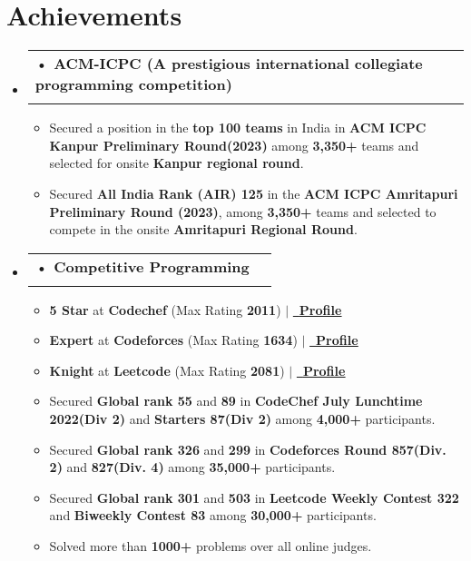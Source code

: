 \documentclass[letterpaper,11pt]{article}
\makeatletter
\newcommand{\resumeItem}[1]{
  \item\small{
	{#1 \vspace{-2pt}}
  }
}
\newcommand{\resumeSubheading}[4]{
  \vspace{-2pt}\item
	\begin{tabular*}{1.0\textwidth}[t]{l@{\extracolsep{\fill}}r}
  	\textbf{#1} & \textbf{\small #2} \\
  	\textit{\small#3} & \textit{\small #4} \\
	\end{tabular*}\vspace{-7pt}
}
\newcommand{\resumeSubHeadingListStart}{\begin{itemize}[leftmargin=0.0in, label={}]}
\newcommand{\resumeSubHeadingListEnd}{\end{itemize}}
\newcommand{\resumeItemListStart}{\begin{itemize}}
\newcommand{\resumeItemListEnd}{\end{itemize}\vspace{-5pt}}
\makeatother
\begin{document}
\section{Achievements }
 \begin{itemize}[leftmargin=0.12in, label={}]
 
  \vspace{-7pt}
   \resumeSubHeadingListStart
   
	\resumeSubheading {\hspace{-5pt}• ACM-ICPC (A prestigious international collegiate programming competition)}{}{}{}
  	\resumeItemListStart
          \vspace{-10pt}
    	 \resumeItem{Secured a position in the \textbf{top 100 teams} in India in \textbf{ACM ICPC Kanpur Preliminary Round(2023)} among \textbf{3,350+} teams and selected for onsite \textbf{Kanpur regional round}.}
         \resumeItem{Secured  \textbf{All India Rank (AIR) 125} in the \textbf{ACM ICPC Amritapuri Preliminary Round (2023)}, among \textbf{3,350+} teams and selected to compete in the onsite \textbf{Amritapuri Regional Round}.}  
	  \resumeItemListEnd
        \vspace{-5pt}

   \resumeSubheading {\hspace{-5pt}• Competitive Programming}{}{}{}
	\resumeItemListStart
        \vspace{-10pt}
    	\resumeItem{\textbf{5 Star} at \textbf{Codechef} (Max Rating \textbf{2011}) $|$  \href{https://www.codechef.com/users/abhi_kant/}{\small \raisebox{-0.2\height}\faLink\  \underline{\textbf{Profile}}}  }
     
        \resumeItem{\textbf{Expert} at \textbf{Codeforces} (Max Rating \textbf{1634}) $|$  \href{https://codeforces.com/profile/abhi_kant}{\small \raisebox{-0.2\height}\faLink\  \underline{\textbf{Profile}}}  }
        
        \resumeItem{\textbf{Knight} at \textbf{Leetcode} (Max Rating \textbf{2081}) $|$  \href{https://leetcode.com/abhi1911/}{\small \raisebox{-0.2\height}\faLink\  \underline{\textbf{Profile}}}  }

    	\resumeItem{Secured \textbf{Global rank 55} and \textbf{89} in \textbf{CodeChef July Lunchtime 2022(Div 2)} and \textbf{Starters 87(Div 2)} among \textbf{4,000+} participants.}
	\resumeItem{Secured \textbf{Global rank 326} and \textbf{299} in \textbf{Codeforces Round 857(Div. 2)} and \textbf{827(Div. 4)} among \textbf{35,000+} participants.}
\resumeItem{Secured \textbf{Global rank 301} and \textbf{503} in \textbf{Leetcode Weekly Contest 322} and \textbf{Biweekly Contest 83} among \textbf{30,000+} participants.}
    	\resumeItem{Solved more than \textbf{1000+} problems over all online judges.}
	  \resumeItemListEnd
   
  \resumeSubHeadingListEnd
 \end{itemize}
\vspace{-11pt}
\end{document}
